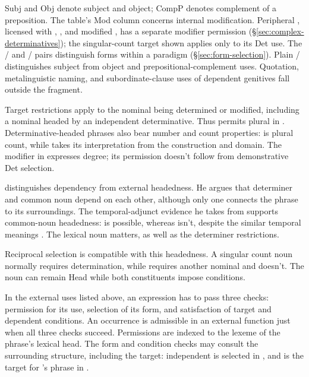\documentclass[12pt]{article}
\begin{document}
Subj and Obj denote subject and object; CompP denotes complement of a preposition. The table's Mod column concerns internal modification. Peripheral , licensed with , , and modified , has a separate modifier permission (§\ref{sec:complex-determinatives}); the singular-count target shown applies only to its Det use. The / and / pairs distinguish forms within a paradigm (§\ref{sec:form-selection}). Plain / distinguishes subject from object and prepositional-complement uses. Quotation, metalinguistic naming, and subordinate-clause uses of dependent genitives fall outside the fragment.

Target restrictions apply to the nominal being determined or modified, including a nominal headed by an independent determinative. Thus  permits plural  in . Determinative-headed phrases also bear number and count properties:  is plural count, while  takes its interpretation from the construction and domain. The modifier  in  expresses degree; its permission doesn't follow from demonstrative Det selection.

\textcite[7--8]{hudson2004determiners} distinguishes dependency from external headedness. He argues that determiner and common noun depend on each other, although only one connects the phrase to its surroundings. The temporal-adjunct evidence he takes from \textcite{vanlangendonck1994} supports common-noun headedness:  is possible, whereas  isn't, despite the similar temporal meanings \citep[10--12]{hudson2004determiners}. The lexical noun matters, as well as the determiner restrictions.

Reciprocal selection is compatible with this headedness. A singular count noun normally requires determination, while  requires another nominal and  doesn't. The noun can remain Head while both constituents impose conditions.

In the external uses listed above, an expression has to pass three checks: permission for its use, selection of its form, and satisfaction of target and dependent conditions. An occurrence is admissible in an external function just when all three checks succeed. Permissions are indexed to the lexeme of the phrase's lexical head. The form and condition checks may consult the surrounding structure, including the target: independent  is selected in , and  is the target for 's phrase in .
\end{document}
